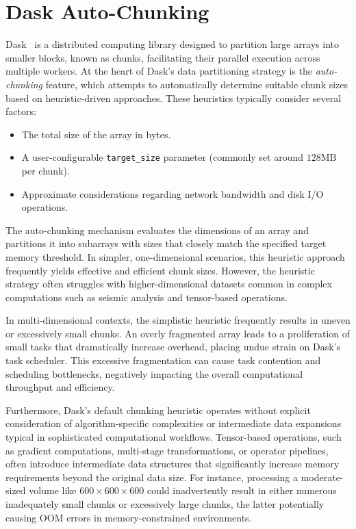 \section{Dask Auto-Chunking}
\label{sec:idp-dask-auto-chunking}

Dask~\cite{rocklin2015dask} is a distributed computing library designed to partition large arrays into smaller blocks, known as chunks, facilitating their parallel execution across multiple workers.
At the heart of Dask’s data partitioning strategy is the \emph{auto-chunking} feature, which attempts to automatically determine suitable chunk sizes based on heuristic-driven approaches.
These heuristics typically consider several factors:

\begin{itemize}
    \item The total size of the array in bytes.
    \item A user-configurable \texttt{target\_size} parameter (commonly set around $128\text{MB}$ per chunk).
    \item Approximate considerations regarding network bandwidth and disk \ac{I/O} operations.
\end{itemize}

The auto-chunking mechanism evaluates the dimensions of an array and partitions it into subarrays with sizes that closely match the specified target memory threshold.
In simpler, one-dimensional scenarios, this heuristic approach frequently yields effective and efficient chunk sizes.
However, the heuristic strategy often struggles with higher-dimensional datasets common in complex computations such as seismic analysis and tensor-based operations.

In multi-dimensional contexts, the simplistic heuristic frequently results in uneven or excessively small chunks.
An overly fragmented array leads to a proliferation of small tasks that dramatically increase overhead, placing undue strain on Dask’s task scheduler.
This excessive fragmentation can cause task contention and scheduling bottlenecks, negatively impacting the overall computational throughput and efficiency.

Furthermore, Dask’s default chunking heuristic operates without explicit consideration of algorithm-specific complexities or intermediate data expansions typical in sophisticated computational workflows.
Tensor-based operations, such as gradient computations, multi-stage transformations, or operator pipelines, often introduce intermediate data structures that significantly increase memory requirements beyond the original data size.
For instance, processing a moderate-sized volume like $600\times600\times600$ could inadvertently result in either numerous inadequately small chunks or excessively large chunks, the latter potentially causing \ac{OOM} errors in memory-constrained environments.

